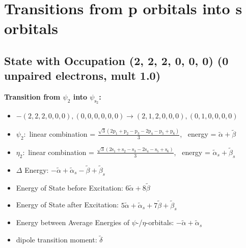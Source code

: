 \documentclass[12pt,a4paper]{article}
\begin{document}
\newpage \section*{Transitions from p orbitals into s orbitals}\subsection*{State with Occupation (2, 2, 2, 0, 0, 0) (0 unpaired electrons, mult 1.0)}
        \noindent\textbf{Transition from $\psi_{2}$ into $\psi_{\text{s}_{2}}$:}
        \begin{itemize}
            \item $- (2, 2, 2, 0, 0, 0), (0, 0, 0, 0, 0, 0) \rightarrow (2, 1, 2, 0, 0, 0), (0, 1, 0, 0, 0, 0)$
        
            \item $\psi_{2}:$ linear combination = $\frac{\sqrt{3} \left(2 \text{p}_{1} + \text{p}_{2} - \text{p}_{3} - 2 \text{p}_{4} - \text{p}_{5} + \text{p}_{6}\right)}{3}$, \
            energy = $\tilde{\alpha} + \tilde{\beta}$
            
            \item $\eta_{2}:$ linear combination = $\frac{\sqrt{3} \left(2 \text{s}_{1} + \text{s}_{2} - \text{s}_{3} - 2 \text{s}_{4} - \text{s}_{5} + \text{s}_{6}\right)}{3}$, \
            energy = $\tilde{\alpha}_{s} + \tilde{\beta}_{s}$
            
                \item $\Delta$ Energy: $- \tilde{\alpha} + \tilde{\alpha}_{s} - \tilde{\beta} + \tilde{\beta}_{s}$
                \item Energy of State before Excitation: $6 \tilde{\alpha} + 8 \tilde{\beta}$
                \item Energy of State after Excitation: $5 \tilde{\alpha} + \tilde{\alpha}_{s} + 7 \tilde{\beta} + \tilde{\beta}_{s}$
                \item Energy between Average Energies of $\psi$-/$\eta$-orbitals: $- \tilde{\alpha} + \tilde{\alpha}_{s}$
            
            \item dipole transition moment: $\tilde{\delta}$
        
        \end{itemize}
        
\end{document}
